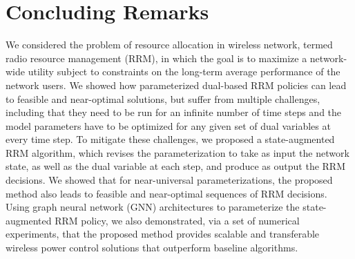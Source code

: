 \documentclass[lettersize,journal]{IEEEtran}
\begin{document}

\section{Concluding Remarks}\label{sec:conclusion}
We considered the problem of resource allocation in wireless network, termed radio resource management (RRM), in which the goal is to maximize a network-wide utility subject to constraints on the long-term average performance of the network users. We showed how parameterized dual-based RRM policies can lead to feasible and near-optimal solutions, but suffer from multiple challenges, including that they need to be run for an infinite number of time steps and the model parameters have to be optimized for any given set of dual variables at every time step. To mitigate these challenges, we proposed a state-augmented RRM algorithm, which revises the parameterization to take as input the network state, as well as the dual variable at each step, and produce as output the RRM decisions. We showed that for near-universal parameterizations, the proposed method also leads to feasible and near-optimal sequences of RRM decisions. Using graph neural network (GNN) architectures to parameterize the state-augmented RRM policy, we also demonstrated, via a set of numerical experiments, that the proposed method provides scalable and transferable wireless power control solutions that outperform baseline algorithms.




\appendices
%







\vfill
\end{document}
